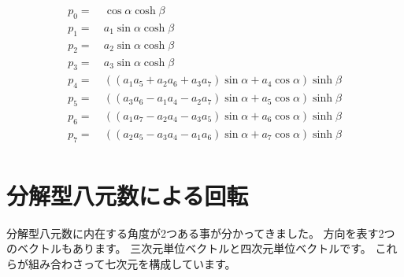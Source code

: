 \documentclass[a4paper,12pt,notitlepage]{jsreport}
\begin{document}
\begin{equation}
\begin{split}
p_0=~&\cos\alpha\cosh\beta\\
p_1=~&a_1\sin\alpha\cosh\beta\\
p_2=~&a_2\sin\alpha\cosh\beta\\
p_3=~&a_3\sin\alpha\cosh\beta\\
p_4=~&((a_1a_5+a_2a_6+a_3a_7)\sin\alpha+a_4\cos\alpha)\sinh\beta\\
p_5=~&((a_3a_6-a_1a_4-a_2a_7)\sin\alpha+a_5\cos\alpha)\sinh\beta\\
p_6=~&((a_1a_7-a_2a_4-a_3a_5)\sin\alpha+a_6\cos\alpha)\sinh\beta\\
p_7=~&((a_2a_5-a_3a_4-a_1a_6)\sin\alpha+a_7\cos\alpha)\sinh\beta\\
\end{split}
\end{equation}

\section{分解型八元数による回転}

分解型八元数に内在する角度が2つある事が分かってきました。
方向を表す2つのベクトルもあります。
三次元単位ベクトルと四次元単位ベクトルです。
これらが組み合わさって七次元を構成しています。
\end{document}
